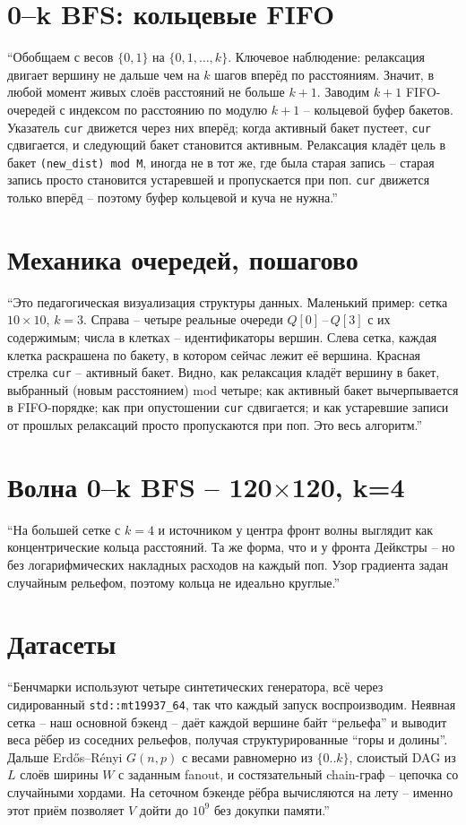 \documentclass[11pt,a4paper]{article}
\begin{document}
\section{0--k BFS: кольцевые FIFO}
``Обобщаем с весов $\{0,1\}$ на $\{0,1,\dots,k\}$. Ключевое
наблюдение: релаксация двигает вершину не дальше чем на $k$ шагов
вперёд по расстояниям. Значит, в любой момент живых слоёв расстояний
не больше $k{+}1$. Заводим $k{+}1$ FIFO-очередей с индексом по
расстоянию по модулю $k{+}1$ -- кольцевой буфер бакетов. Указатель
\texttt{cur} движется через них вперёд; когда активный бакет пустеет,
\texttt{cur} сдвигается, и следующий бакет становится активным.
Релаксация кладёт цель в бакет \texttt{(new\_dist) mod M}, иногда не
в тот же, где была старая запись -- старая запись просто становится
устаревшей и пропускается при поп. \texttt{cur} движется только
вперёд -- поэтому буфер кольцевой и куча не нужна.''
\hrulefill

\section{Механика очередей, пошагово}
``Это педагогическая визуализация структуры данных. Маленький пример:
сетка $10\times10$, $k=3$. Справа -- четыре реальные очереди
$Q[0]$\,--\,$Q[3]$ с их содержимым; числа в клетках -- идентификаторы
вершин. Слева сетка, каждая клетка раскрашена по бакету, в котором
сейчас лежит её вершина. Красная стрелка \texttt{cur} -- активный
бакет. Видно, как релаксация кладёт вершину в бакет, выбранный
(новым расстоянием) mod четыре; как активный бакет вычерпывается в
FIFO-порядке; как при опустошении \texttt{cur} сдвигается; и как
устаревшие записи от прошлых релаксаций просто пропускаются при поп.
Это весь алгоритм.''
\hrulefill

\section{Волна 0--k BFS -- 120$\times$120, k=4}
``На большей сетке с $k=4$ и источником у центра фронт волны выглядит
как концентрические кольца расстояний. Та же форма, что и у фронта
Дейкстры -- но без логарифмических накладных расходов на каждый поп.
Узор градиента задан случайным рельефом, поэтому кольца не идеально
круглые.''
\hrulefill

\section{Датасеты}
``Бенчмарки используют четыре синтетических генератора, всё через
сидированный \texttt{std::mt19937\_64}, так что каждый запуск
воспроизводим. Неявная сетка -- наш основной бэкенд -- даёт каждой
вершине байт ``рельефа'' и выводит веса рёбер из соседних рельефов,
получая структурированные ``горы и долины''. Дальше Erdős--Rényi
$G(n,p)$ с весами равномерно из $\{0..k\}$, слоистый DAG из $L$ слоёв
ширины $W$ с заданным fanout, и состязательный chain-граф -- цепочка
со случайными хордами. На сеточном бэкенде рёбра вычисляются на лету
-- именно этот приём позволяет $V$ дойти до $10^9$ без докупки
памяти.''
\hrulefill
\end{document}
